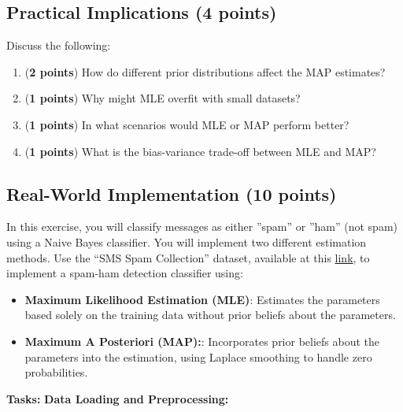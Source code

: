\documentclass[a3paper,12pt]{extarticle} %
\begin{document}
\subsection{Practical Implications (4 points)}
Discuss the following:
\begin{enumerate}
    \item (\textbf{2 points})  How do different prior distributions affect the MAP estimates?
    \item (\textbf{1 points})  Why might MLE overfit with small datasets?
    \item (\textbf{1 points})  In what scenarios would MLE or MAP perform better?
    \item (\textbf{1 points})  What is the bias-variance trade-off between MLE and MAP?
\end{enumerate}
\subsection{Real-World Implementation (10 points)}
In this exercise, you will classify messages as either ”spam” or ”ham” (not spam) using a Naive Bayes
classifier. You will implement two different estimation methods. Use the “SMS Spam Collection” dataset,
available at this \href{https://archive.ics.uci.edu/ml/datasets/SMS+Spam+Collection}{link}, to implement a spam-ham detection classifier using:
\begin{itemize}
    \item \textbf{Maximum Likelihood Estimation (MLE)}:  Estimates the parameters based solely on the training data without prior beliefs about the parameters.
    \item \textbf{Maximum A Posteriori (MAP):}: Incorporates prior beliefs about the parameters into the estimation, using Laplace smoothing to handle zero probabilities. 
\end{itemize}
\textbf{Tasks:}
\textbf{Data Loading and Preprocessing:}
\end{document}
